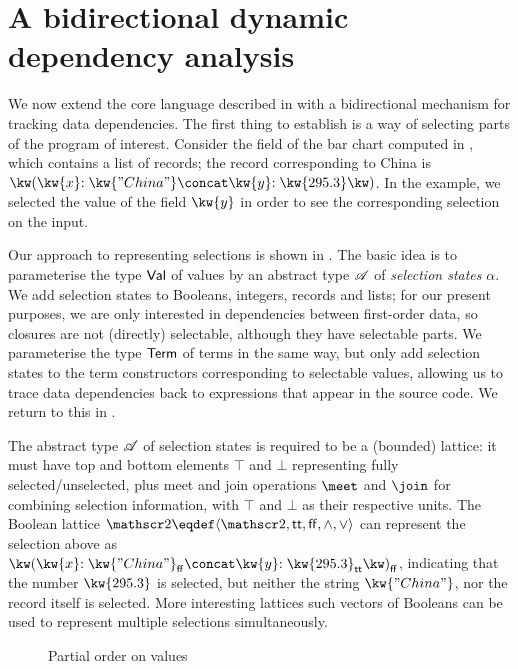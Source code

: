 \section{A bidirectional dynamic dependency analysis}
\label{sec:data-dependencies}

We now extend the core language described in  with a bidirectional mechanism for tracking data dependencies. The first thing to establish is a way of selecting parts of the program of interest. Consider the  field of the bar chart computed in , which contains a list of records; the record corresponding to China is $\exRec{\bind{\kw{x}}{\kw{"China"}} \concat \bind{\kw{y}}{\kw{295.3}}}$. In the example, we selected the value of the field $\kw{y}$ in order to see the corresponding selection on the input.

Our approach to representing selections is shown in . The basic idea is to parameterise the type $\textup{\textsf{Val}}$ of values by an abstract type $\mathscr{A}$ of \emph{selection states} $\alpha$. We add selection states to Booleans, integers, records and lists; for our present purposes, we are only interested in dependencies between first-order data, so closures are not (directly) selectable, although they have selectable parts. We parameterise the type $\textup{\textsf{Term}}$ of terms in the same way, but only add selection states to the term constructors corresponding to selectable values, allowing us to trace data dependencies back to expressions that appear in the source code. We return to this in .



The abstract type $\mathscr{A}$ of selection states is required to be a (bounded) lattice: it must have top and bottom elements $\top$ and $\bot$ representing fully selected/unselected, plus meet and join operations $\meet$ and $\join$ for combining selection information, with $\top$ and $\bot$ as their respective units. The Boolean lattice $\Bool \eqdef \Lattice{\Bool}{\TT}{\FF}{\wedge}{\vee}$ can represent the selection above as $\annRec{\bind{\kw{x}}{\annStr{\kw{"China"}}{\FF}} \concat \bind{\kw{y}}{\annInt{\kw{295.3}}{\TT}}}{\FF}$, indicating that the number $\exInt{\kw{295.3}}$ is selected, but neither the string $\exStr{\kw{"China"}}$, nor the record itself is selected. More interesting lattices such vectors of Booleans can be used to represent multiple selections simultaneously.

\begin{figure}
   
   \caption{Partial order on values}
   \label{fig:data-dependencies:leq}
\end{figure}



